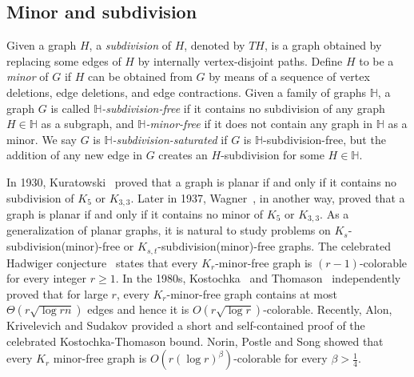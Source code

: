 \documentclass[11pt, a4paper]{article}
\theoremstyle{definition}
\newcommand{\<}{\subseteq}
\begin{document}
\subsection{Minor and subdivision} 
Given a graph $H$, a {\textit{subdivision}} of $H$, denoted by $TH$, is a graph obtained by replacing some edges of $H$ by internally vertex-disjoint paths.
Define $H$ to be a {\textit{minor}} of $G$ if $H$ can be obtained from $G$ by means of a sequence of vertex deletions, edge deletions, and edge contractions.
Given a family of graphs $\mathbb{H}$, a graph $G$ is called \textit{$\mathbb{H}$-subdivision-free} if it contains no subdivision of any graph $H\in \mathbb{H}$ as a subgraph, and \textit{$\mathbb{H}$-minor-free} if it does not contain any graph in $\mathbb{H}$ as a minor. We say $G$ is \textit{$\mathbb{H}$-subdivision-saturated} if $G$ is $\mathbb{H}$-subdivision-free, but the addition of any new edge in $G$ creates an $H$-subdivision for some $H\in \mathbb{H}$. %

In 1930, Kuratowski~\cite{kuratowski1930probleme} proved that a graph is planar if and only if it contains no subdivision of $K_5$ or $K_{3,3}$.
Later in 1937, Wagner~\cite{Wagner1937}, in another way, proved that a graph is planar if and only if it contains no minor of $K_5$ or $K_{3,3}$.
As a generalization of planar graphs, it is natural to study problems on $K_s$-subdivision(minor)-free or $K_{s,t}$-subdivision(minor)-free graphs. 
The celebrated  Hadwiger conjecture~\cite{1943Hadwiger} states that %
every $K_r$-minor-free graph is $(r-1)$-colorable for every integer $r\geq1$. In the 1980s, Kostochka~\cite{kostochka1982minimum} and Thomason~\cite{thomason1984extremal} independently proved that for large $r$, every $K_r$-minor-free graph contains at most $\Theta(r\sqrt{\log rn})$ edges and hence it is $O(r\sqrt{\log r})$-colorable. Recently, Alon, Krivelevich and Sudakov \cite{Alon2023} provided a short and self-contained proof of the celebrated Kostochka-Thomason bound. 
Norin, Postle and Song \cite{Song2023} showed that every $K_r$ minor-free graph 
is $O(r(\log r)^\beta)$-colorable for every $\beta>\frac{1}{4}$. %
\end{document}
